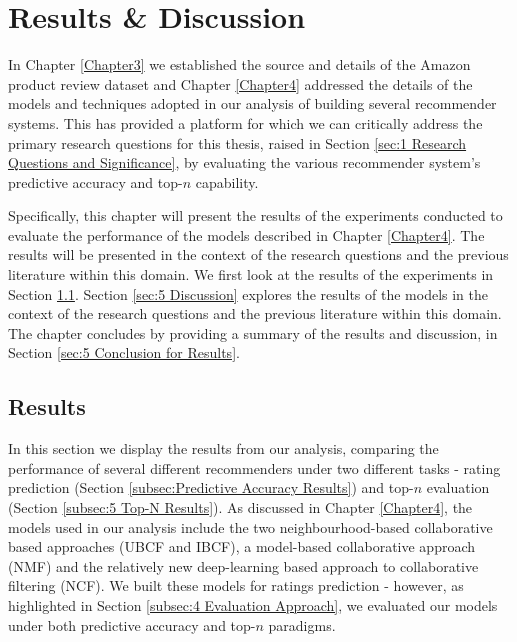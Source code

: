 \chapter{Results \& Discussion} %

\label{Chapter5} %

In Chapter \ref{Chapter3} we established the source and details of the Amazon product review dataset and Chapter \ref{Chapter4} addressed the details of the models and techniques adopted in our analysis of building several recommender systems.  This has provided a platform for which we can critically address the primary research questions for this thesis, raised in Section \ref{sec:1 Research Questions and Significance}, by evaluating the various recommender system's predictive accuracy and top-$n$ capability. 

Specifically, this chapter will present the results of the experiments conducted to evaluate the performance of the models described in Chapter \ref{Chapter4}. The results will be presented in the context of the research questions and the previous literature within this domain. We first look at the results of the experiments in Section \ref{sec:5 Results}. Section \ref{sec:5 Discussion} explores the results of the models in the context of the research questions and the previous literature within this domain. The chapter concludes by providing a summary of the results and discussion, in Section \ref{sec:5 Conclusion for Results}.


\section{Results}
\label{sec:5 Results}

In this section we display the results from our analysis, comparing the performance of several different recommenders under two different tasks - rating prediction (Section \ref{subsec:Predictive Accuracy Results}) and top-$n$ evaluation (Section \ref{subsec:5 Top-N Results}). As discussed in Chapter \ref{Chapter4}, the models used in our analysis include the two neighbourhood-based collaborative based approaches (UBCF and IBCF), a model-based collaborative approach (NMF) and the relatively new deep-learning based approach to collaborative filtering (NCF). We built these models for ratings prediction - however, as highlighted in Section \ref{subsec:4 Evaluation Approach}, we evaluated our models under both predictive accuracy and top-$n$ paradigms. 

